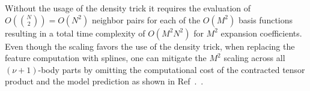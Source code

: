 Without the usage of the density trick it requires the evaluation of $O({N\choose 2}) = O(N^2)$ neighbor pairs for each of the $O(M^2)$ basis functions resulting in a total time complexity of $O(M^2N^2)$ for $M^2$ expansion coefficients.
Even though the scaling favors the use of the density trick, when replacing the feature computation with splines, one can mitigate the $M^2$ scaling across all $(\nu+1)$-body parts by omitting the computational cost of the contracted tensor product and the model prediction as shown in Ref~.~\cite{xie2023ultra}.

